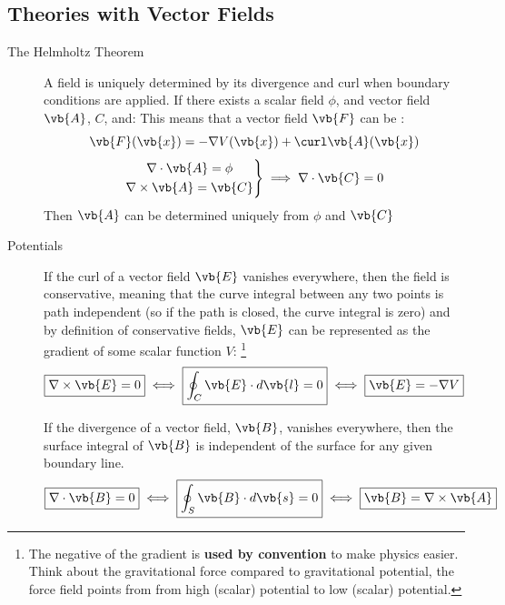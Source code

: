 \subsection{Theories with Vector Fields \label{vectorfields}}
    \begin{description}
		\item [The Helmholtz Theorem]		
	
        A field is uniquely determined by its divergence and curl when boundary conditions are applied. If there exists a scalar field \(\phi\), and vector field \(\vb{A}\), \(C\), and:
        This means that a vector field \(\vb{F}\) can be :
        \begin{equation}
            \vb{F}(\vb{x})=-\nabla V(\vb{x})+\curl\vb{A}(\vb{x})
        \end{equation}
        \begin{align*}
            \left.
            \begin{gathered}
            \nabla \cdot \vb{A}= \phi
            \\
            \nabla \times \vb{A}= \vb{C}
            \end{gathered}
            \right\}
            \implies
            \nabla \cdot \vb{C} = 0
        \end{align*}
        Then \(\vb{A}\) can be determined uniquely from $\phi$ and $\vb{C}$
		\item [Potentials] If the curl of a vector field $\vb{E}$ vanishes everywhere, then the field is conservative, meaning that the curve integral between any two points is path independent (so if the path is closed, the curve integral is zero) and by definition of conservative fields, $\vb{E}$ can be represented as the gradient of some scalar function $V$:
			\footnote{The negative of the gradient is \textbf{used by convention} to make physics easier. Think about the gravitational force compared to gravitational potential, the force field points from from high (scalar) potential to low (scalar) potential.}
			\begin{align*}
				\boxed{\nabla \times \vb{E} = 0} 
				\iff
				\boxed{\oint_C \vb{E}\cdot d\vb{l}=0} 
				\iff
				\boxed{\vb{E} = -\nabla V}
			\end{align*}

			If the divergence of a vector field, $\vb{B}$, vanishes everywhere, then the surface integral of $\vb{B}$ is independent of the surface for any given boundary line. 
			\begin{align*}
				\boxed{\nabla \cdot \vb{B} = 0} 
				\iff
				\boxed{\oint_S\vb{B}\cdot d\vb{s}=0}
				\iff
				\boxed{\vb{B} = \nabla \times \vb{A}}
			\end{align*}
	\end{description}